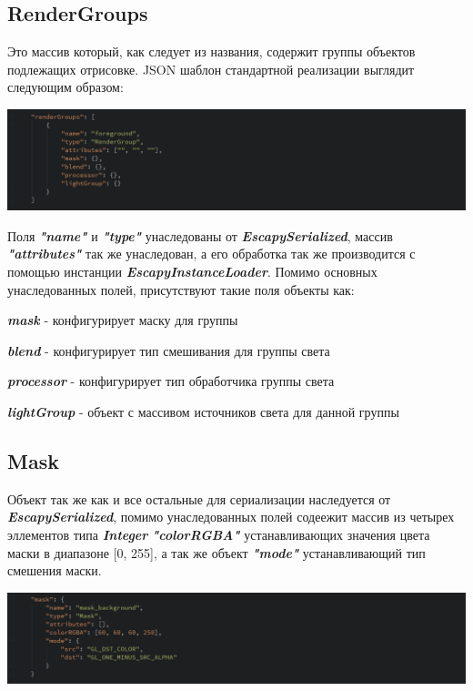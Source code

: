 \documentclass[11pt]{report}
\newenvironment{itemize*}%
  {\begin{itemize}%
    \setlength{\itemsep}{2pt}%
    \setlength{\parskip}{0.75pt}}%
  {\end{itemize}}
\begin{document}
\subsection{RenderGroups}
Это массив который, как следует из названия, содержит группы объектов подлежащих отрисовке. JSON шаблон стандартной реализации выглядит следующим образом:
\begin{center}
	\includegraphics[width=1.2\linewidth]{img/24.png} 
  	\label{img:240} 
\end{center}
Поля \textit{\textbf{"name"}} и \textit{\textbf{"type"}} унаследованы от \textit{\textbf{EscapySerialized}}, массив \textit{\textbf{"attributes"}} так же унаследован, а его обработка так же производится с помощью инстанции \textit{\textbf{EscapyInstanceLoader}}. Помимо основных унаследованных полей, присутствуют такие поля объекты как: \begin{itemize*}
	\item \textit{\textbf{mask}} - конфигурирует маску для группы
	\item \textit{\textbf{blend}} - конфигурирует тип смешивания для группы света
	\item \textit{\textbf{processor}} - конфигурирует тип обработчика группы света
	\item \textit{\textbf{lightGroup}} - объект с массивом источников света для данной 			группы\\
\end{itemize*}

\subsection{Mask}
Объект так же как и все остальные для сериализации наследуется от \textit{\textbf{EscapySerialized}}, помимо унаследованных полей содеежит массив из четырех эллементов типа \textit{\textbf{Integer}} \textit{\textbf{"colorRGBA"}} устанавливающих значения цвета маски в диапазоне [0, 255], а так же объект \textit{\textbf{"mode"}} устанавливающий тип смешения маски.
\begin{center}
	\includegraphics[width=1.2\linewidth]{img/25.png} 
  	\label{img:250} 
\end{center}
\end{document}
